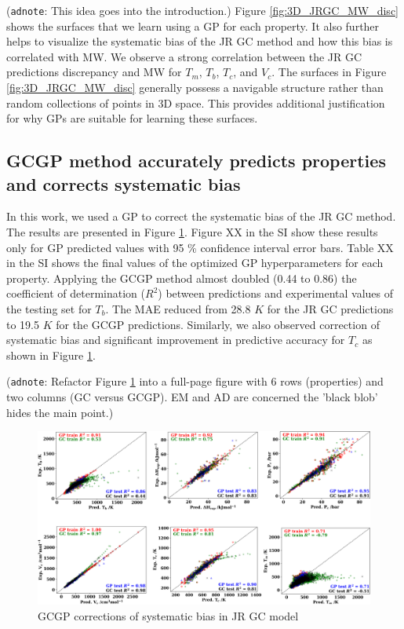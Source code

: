 \documentclass[journal=jacsat,manuscript=article]{achemso}
\newcommand{\adnote}[1]{{\color{OliveGreen} (\texttt{adnote}: #1)}}
\begin{document}
\adnote{This idea goes into the introduction.} Figure \ref{fig:3D_JRGC_MW_disc} shows the surfaces that we learn using a GP for each property. It also further helps to visualize the systematic bias of the JR GC method and how this bias is correlated with MW. We observe a strong correlation between the JR GC predictions discrepancy and MW for $T_m$, $T_b$, $T_c$, and $V_c$. The surfaces in Figure \ref{fig:3D_JRGC_MW_disc} generally possess a navigable structure rather than random collections of points in 3D space. This provides additional justification for why GPs are suitable for learning these surfaces.


\subsection{GCGP method accurately predicts properties and corrects systematic bias}

In this work, we used a GP to correct the systematic bias of the JR GC method. The results are presented in Figure \ref{fig:GCGP_final_results}. Figure XX in the SI show these results only for GP predicted values with 95 \% confidence interval error bars. Table XX in the SI shows the final values of the optimized GP hyperparameters for each property.
Applying the GCGP method almost doubled (0.44 to 0.86) the coefficient of determination ($R^2$) between predictions and experimental values of the testing set for $T_b$. The MAE reduced from 28.8 $K$ for the JR GC predictions to 19.5 $K$ for the GCGP predictions. 
Similarly, we also observed correction of systematic bias and significant improvement in predictive accuracy for $T_c$ as shown in Figure \ref{fig:GCGP_final_results}.

\adnote{Refactor Figure \ref{fig:GCGP_final_results} into a full-page figure with 6 rows (properties) and two columns (GC versus GCGP). EM and AD are concerned the 'black blob' hides the main point.}

\begin{figure}[H]
    \centering
    \includegraphics[width=1.1\linewidth]{images/GCGP_final_results.png}
    \caption{GCGP corrections of systematic bias in JR GC model}
    \label{fig:GCGP_final_results}
\end{figure}
\end{document}
